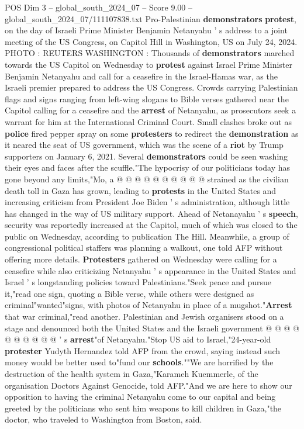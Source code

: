 \begin{textsample}{POS Dim 3 – global\_south\_2024\_07 – Score 9.00 – global\_south\_2024\_07/111107838.txt}  \label{ex:f3_pos_311}
Pro-Palestinian \textbf{demonstrators} \textbf{protest}, on the day of Israeli Prime Minister Benjamin Netanyahu ' s address to a joint meeting of the US Congress, on Capitol Hill in Washington, US on July 24, 2024.
PHOTO : REUTERS WASHINGTON : Thousands of \textbf{demonstrators} marched towards the US Capitol on Wednesday to \textbf{protest} against Israel Prime Minister Benjamin Netanyahu and call for a ceasefire in the Israel-Hamas war, as the Israeli premier prepared to address the US Congress.
Crowds carrying Palestinian flags and signs ranging from left-wing slogans to Bible verses gathered near the Capitol calling for a ceasefire and the \textbf{arrest} of Netanyahu, as prosecutors seek a warrant for him at the International Criminal Court.
Small clashes broke out as \textbf{police} fired pepper spray on some \textbf{protesters} to redirect the \textbf{demonstration} as it neared the seat of US government, which was the scene of a \textbf{riot} by Trump supporters on January 6, 2021.
Several \textbf{demonstrators} could be seen washing their eyes and faces after the scuffle."The hypocrisy of our politicians today has gone beyond any limits,"Mo, a @ @ @ @ @ @ @ @ @ @ strained as the civilian death toll in Gaza has grown, leading to \textbf{protests} in the United States and increasing criticism from President Joe Biden ' s administration, although little has changed in the way of US military support.
Ahead of Netanayahu ' s \textbf{speech}, security was reportedly increased at the Capitol, much of which was closed to the public on Wednesday, according to publication The Hill.
Meanwhile, a group of congressional political staffers was planning a walkout, one told AFP without offering more details. \textbf{Protesters} gathered on Wednesday were calling for a ceasefire while also criticizing Netanyahu ' s appearance in the United States and Israel ' s longstanding policies toward Palestinians."Seek peace and pursue it,"read one sign, quoting a Bible verse, while others were designed as criminal"wanted"signs, with photos of Netanyahu in place of a mugshot."\textbf{Arrest} that war criminal,"read another.
Palestinian and Jewish organisers stood on a stage and denounced both the United States and the Israeli government @ @ @ @ @ @ @ @ @ @ ' s \textbf{arrest}"of Netanyahu."Stop US aid to Israel,"24-year-old \textbf{protester} Yudyth Hernandez told AFP from the crowd, saying instead such money would be better used to"fund our \textbf{schools}.""We are horrified by the destruction of the health system in Gaza,"Karameh Kuemmerle, of the organisation Doctors Against Genocide, told AFP."And we are here to show our opposition to having the criminal Netanyahu come to our capital and being greeted by the politicians who sent him weapons to kill children in Gaza,"the doctor, who traveled to Washington from Boston, said.

\end{textsample}
